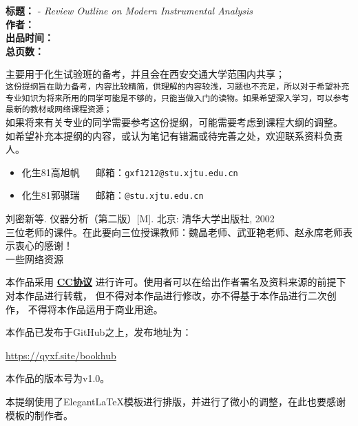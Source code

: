 \newpage
\hypersetup{pageanchor=true}

\begin{tcolorbox}[title={\bfseries 作品信息}]
	\makeatletter
	 \textbf{标题：}\@title{} - \textit{Review Outline on Modern Instrumental Analysis}\\
	 \textbf{作者：}\@author\\
	 \textbf{出品时间：}\@date\\
	 \textbf{总页数：}\pageref{LastPage}
	\makeatother
\end{tcolorbox}

\begin{tcolorbox}[title={\bfseries 关于本提纲用途的说明}]
 主要用于化生试验班的备考，并且会在西安交通大学范围内共享；\\
 \texttt{这份提纲旨在助力备考，内容比较精简，供理解的内容较浅，习题也不充足，所以对于希望补充专业知识为将来所用的同学可能是不够的，只能当做入门的读物。如果希望深入学习，可以参考最新的教材或网络课程资源；}\\
 如果将来有关专业的同学需要参考这份提纲，可能需要考虑到课程大纲的调整。
 如希望补充本提纲的内容，或认为笔记有错漏或待完善之处，欢迎联系资料负责人。
\begin{itemize}
	\item 化生81\hspace{1em}高旭帆\hspace{1em} \faEnvelopeOpen ~~ 邮箱：\texttt{gxf1212@stu.xjtu.edu.cn}
	\item 化生81\hspace{1em}郭骐瑞\hspace{1em} \faEnvelopeOpen ~~ 邮箱：\texttt{@stu.xjtu.edu.cn}
\end{itemize}
\end{tcolorbox}

\begin{tcolorbox}[title={\bfseries 主要参考资料}]
 刘密新等. 仪器分析（第二版）[M]. 北京: 清华大学出版社, 2002\\
 三位老师的课件。在此要向三位授课教师：魏晶老师、武亚艳老师、赵永席老师表示衷心的感谢！\\
 一些网络资源
\end{tcolorbox}


\begin{tcolorbox}[title={\bfseries 许可证说明}]
\centerline{}
本作品采用 \href{https://creativecommons.org/licenses/by-nc-nd/4.0/}{\textbf{CC协议}}
进行许可。使用者可以在给出作者署名及资料来源的前提下对本作品进行转载，
但不得对本作品进行修改，亦不得基于本作品进行二次创作，
不得将本作品运用于商业用途。
\end{tcolorbox}

\begin{tcolorbox}
	本作品已发布于GitHub之上，发布地址为：\\
	\centerline{\url{https://qyxf.site/bookhub}}
	本作品的版本号为\textsf{v1.0}。
	
	本提纲使用了Elegant\LaTeX 模板进行排版，并进行了微小的调整，在此也要感谢模板的制作者。
\end{tcolorbox}



